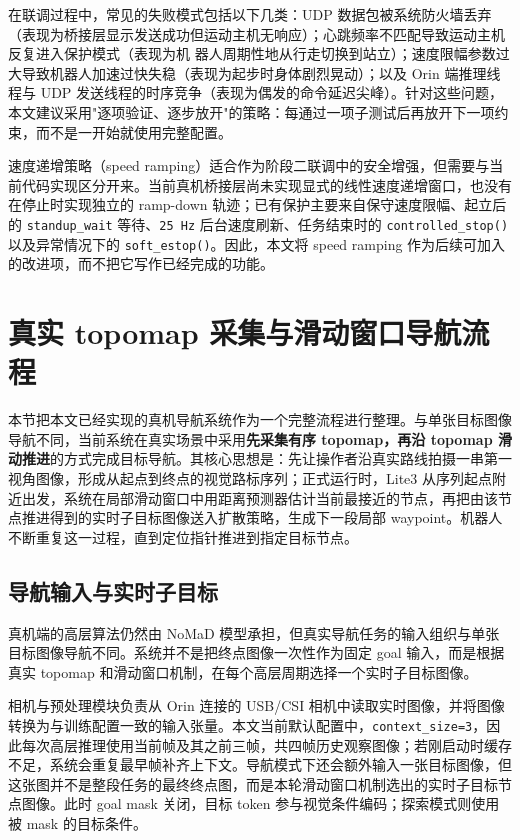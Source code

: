 在联调过程中，常见的失败模式包括以下几类：UDP 数据包被系统防火墙丢弃（表现为桥接层显示发送成功但运动主机无响应）；心跳频率不匹配导致运动主机反复进入保护模式（表现为机
器人周期性地从行走切换到站立）；速度限幅参数过大导致机器人加速过快失稳（表现为起步时身体剧烈晃动）；以及 Orin 端推理线程与 UDP
发送线程的时序竞争（表现为偶发的命令延迟尖峰）。针对这些问题，本文建议采用"逐项验证、逐步放开"的策略：每通过一项子测试后再放开下一项约束，而不是一开始就使用完整配置。

速度递增策略（speed ramping）适合作为阶段二联调中的安全增强，但需要与当前代码实现区分开来。当前真机桥接层尚未实现显式的线性速度递增窗口，也没有在停止时实现独立的 ramp-down 轨迹；已有保护主要来自保守速度限幅、起立后的 \texttt{standup\_wait} 等待、\texttt{25\,Hz} 后台速度刷新、任务结束时的 \texttt{controlled\_stop()} 以及异常情况下的 \texttt{soft\_estop()}。因此，本文将 speed ramping 作为后续可加入的改进项，而不把它写作已经完成的功能。

\section{真实 topomap 采集与滑动窗口导航流程}

本节把本文已经实现的真机导航系统作为一个完整流程进行整理。与单张目标图像导航不同，当前系统在真实场景中采用\textbf{先采集有序 topomap，再沿 topomap 滑动推进}的方式完成目标导航。其核心思想是：先让操作者沿真实路线拍摄一串第一视角图像，形成从起点到终点的视觉路标序列；正式运行时，Lite3 从序列起点附近出发，系统在局部滑动窗口中用距离预测器估计当前最接近的节点，再把由该节点推进得到的实时子目标图像送入扩散策略，生成下一段局部 waypoint。机器人不断重复这一过程，直到定位指针推进到指定目标节点。

\subsection{导航输入与实时子目标}

真机端的高层算法仍然由 NoMaD 模型承担，但真实导航任务的输入组织与单张目标图像导航不同。系统并不是把终点图像一次性作为固定 goal 输入，而是根据真实 topomap 和滑动窗口机制，在每个高层周期选择一个实时子目标图像。

相机与预处理模块负责从 Orin 连接的 USB/CSI 相机中读取实时图像，并将图像转换为与训练配置一致的输入张量。本文当前默认配置中，\texttt{context\_size=3}，因此每次高层推理使用当前帧及其之前三帧，共四帧历史观察图像；若刚启动时缓存不足，系统会重复最早帧补齐上下文。导航模式下还会额外输入一张目标图像，但这张图并不是整段任务的最终终点图，而是本轮滑动窗口机制选出的实时子目标节点图像。此时 goal mask 关闭，目标 token 参与视觉条件编码；探索模式则使用被 mask 的目标条件。

